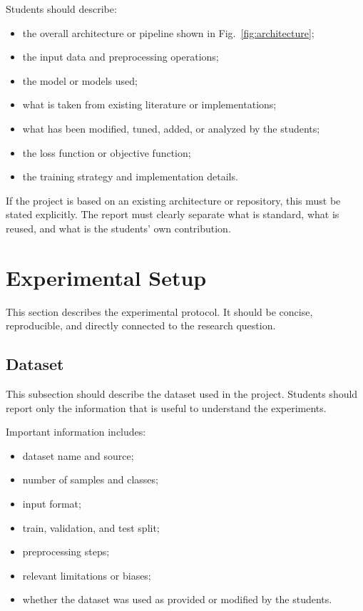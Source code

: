 \documentclass[10pt,twocolumn,a4paper]{article}
\begin{document}
 Students should describe:
 \begin{itemize}
  \item the overall architecture or pipeline shown in Fig.~\ref{fig:architecture};
  \item the input data and preprocessing operations;
  \item the model or models used;
  \item what is taken from existing literature or implementations;
  \item what has been modified, tuned, added, or analyzed by the students;
  \item the loss function or objective function;
  \item the training strategy and implementation details.
 \end{itemize}
 
 If the project is based on an existing architecture or repository, this must be stated explicitly. The report must clearly separate what is standard, what is reused, and what is the students' own contribution.
 
 \section{Experimental Setup}
 
 This section describes the experimental protocol. It should be concise, reproducible, and directly connected to the research question.
 
 \subsection{Dataset}
 
 This subsection should describe the dataset used in the project. Students should report only the information that is useful to understand the experiments.
 
 Important information includes:
 \begin{itemize}
  \item dataset name and source;
  \item number of samples and classes;
  \item input format;
  \item train, validation, and test split;
  \item preprocessing steps;
  \item relevant limitations or biases;
  \item whether the dataset was used as provided or modified by the students.
 \end{itemize}
 
\end{document}
